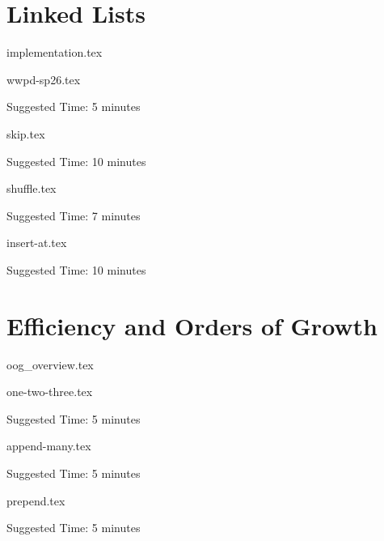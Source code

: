 \documentclass{exam}
\begin{document}
\section{Linked Lists}
\begin{questions}

    {implementation.tex}

    {wwpd-sp26.tex}
    \begin{questionmeta}
        Suggested Time: 5 minutes
    \end{questionmeta}
    \newpage
    {skip.tex}
    \begin{questionmeta}
        Suggested Time: 10 minutes
    \end{questionmeta}

    {shuffle.tex}
    \begin{questionmeta}
        Suggested Time: 7 minutes
    \end{questionmeta}

    {insert-at.tex}
    \begin{questionmeta}
        Suggested Time: 10 minutes
    \end{questionmeta}

\end{questions}

\section{Efficiency and Orders of Growth}
\begin{questions}

    {oog_overview.tex}

    {one-two-three.tex}
    \begin{questionmeta}
        Suggested Time: 5 minutes
    \end{questionmeta}

    {append-many.tex}
    \begin{questionmeta}
        Suggested Time: 5 minutes
    \end{questionmeta}

    {prepend.tex}
    \begin{questionmeta}
        Suggested Time: 5 minutes
    \end{questionmeta}

\end{questions}
\end{document}
